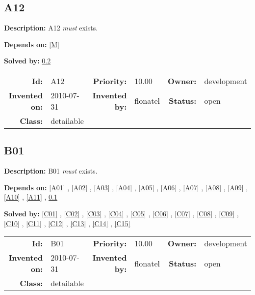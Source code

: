 \subsection{A12}\label{A12}
\textbf{Description:} A12 \textsl{must} exists.

\textbf{Depends on:} \ref{M} 

\textbf{Solved by:} \ref{B01} 

\par
{\small \begin{center}\begin{tabular}{rlrlrl}
\textbf{Id:} & A12  & \textbf{Priority:} & 10.00  & \textbf{Owner:} & development\\ 
\textbf{Invented on:} & 2010-07-31  & \textbf{Invented by:} & flonatel  & \textbf{Status:} & open \\ 
\textbf{Class:} & detailable  & & & \end{tabular}\end{center} }
\subsection{B01}\label{B01}
\textbf{Description:} B01 \textsl{must} exists.

\textbf{Depends on:} \ref{A01} , \ref{A02} , \ref{A03} , \ref{A04} , \ref{A05} , \ref{A06} , \ref{A07} , \ref{A08} , \ref{A09} , \ref{A10} , \ref{A11} , \ref{A12} 

\textbf{Solved by:} \ref{C01} , \ref{C02} , \ref{C03} , \ref{C04} , \ref{C05} , \ref{C06} , \ref{C07} , \ref{C08} , \ref{C09} , \ref{C10} , \ref{C11} , \ref{C12} , \ref{C13} , \ref{C14} , \ref{C15} 

\par
{\small \begin{center}\begin{tabular}{rlrlrl}
\textbf{Id:} & B01  & \textbf{Priority:} & 10.00  & \textbf{Owner:} & development\\ 
\textbf{Invented on:} & 2010-07-31  & \textbf{Invented by:} & flonatel  & \textbf{Status:} & open \\ 
\textbf{Class:} & detailable  & & & \end{tabular}\end{center} }
